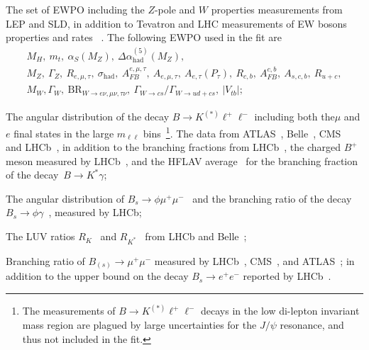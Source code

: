 \begin{itemize}
	\setlength\itemsep{0em}
	{\item The set of EWPO including the $Z$-pole and $W$ properties measurements from LEP and SLD, in addition to  Tevatron and LHC measurements of  EW bosons properties and rates ~\cite{ALEPH:2005ab,Abe:2000uc,Group:2012gb,Schael:2013ita,Aaboud:2017svj,Khachatryan:2014iya,Abazov:2011ws}. The following EWPO used in the fit are
		\begin{gather*}
			M_H,~m_t,~\alpha_S(M_Z),~\Delta \alpha_{\mathrm{had}}^{(5)}(M_Z),\\
			M_{Z},~\Gamma_{Z},~R_{e,\mu,\tau},~\sigma_{\mathrm{had}}, ~A^{e,\mu,\tau}_{FB},~A_{e,\mu,\tau},~A_{e,\tau}(P_\tau),~ R_{c,b},~A^{c,b}_{FB},~A_{s,c,b},~R_{u+c}, \\
			M_{W},\Gamma_{W},~\mathrm{BR}_{W\to e \nu,\mu \nu,\tau \nu},~\Gamma_{W\to cs}/\Gamma_{W\to ud+cs},~\left|V_{tb}\right|;
		\end{gather*}
	}
	\item The angular distribution of the decay $B\to K^{(*)}\ell^+\ell^-$ including both the$\mu$ and $e$ final states in the large $m_{\ell \ell}$ bins~\footnote{The measurements of  $B\to K^{(*)}\ell^+\ell^-$ decays in the low di-lepton invariant mass region are plagued by large uncertainties for the $J/\psi$ resonance, and thus not included in the fit.}.   The data from ATLAS~\cite{Aaboud:2018krd}, Belle~\cite{Wehle:2016yoi}, CMS~\cite{Khachatryan:2015isa,Sirunyan:2017dhj} and LHCb~\cite{Aaij:2015dea,Aaij:2020nrf}, in addition to the branching fractions from LHCb~\cite{Aaij:2016flj}, the charged $B^+$ meson measured by LHCb~\cite{Aaij:2014pli}, and the HFLAV average~\cite{Amhis:2019ckw} for the branching fraction of the decay~$B\to K^*\gamma$; 
	\item The angular distribution of $B_s\to \phi\mu^+\mu^-$~\cite{Aaij:2015esa} and the branching ratio of  the decay $B_s\to\phi\gamma$~\cite{Aaij:2012ita}, measured by LHCb;
	\item The LUV ratios $R_K$~\cite{Aaij:2019wad} and $R_{K^*}$~\cite{Aaij:2017vbb} from LHCb and Belle~\cite{Abdesselam:2019wac};
	\item Branching ratio of $B_{(s)}\to \mu^+\mu^-$ measured by LHCb~\cite{Aaij:2017vad}, CMS~\cite{Chatrchyan:2013bka}, and ATLAS~\cite{Aaboud:2018mst}; in addition to the upper bound on the decay $B_s\to e^+e^-$ reported by LHCb~\cite{Aaij:2020nol}. 
\end{itemize}
